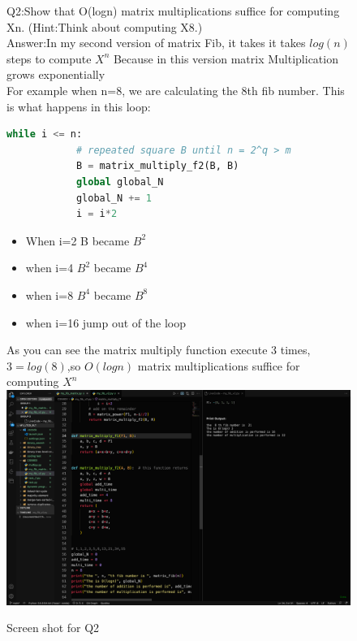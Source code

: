 \documentclass{article}
\begin{document}
\begin{enumerate}[label=(\alph*)]
    \begin{figure}[h]
    \item Q2:Show that O(logn) matrix multiplications suffice for computing Xn. (Hint:Think about computing X8.)\\
    Answer:In my second version of matrix Fib, it takes it takes $log(n)$ steps to compute $X^n$
    Because in this version matrix Multiplication grows exponentially\\
    \noindent For example when n=8, we are calculating the 8th fib number. This is what happens in this loop:
    \begin{lstlisting}[language=Python, caption=loop code]
        while i <= n:
            # repeated square B until n = 2^q > m
            B = matrix_multiply_f2(B, B)
            global global_N
            global_N += 1
            i = i*2
        \end{lstlisting}
    \begin{itemize}
        \item When i=2 B became $B^2$
        \item when i=4 $B^2$ became $B^4$
        \item when i=8 $B^4$ became $B^8$
        \item when i=16 jump out of the loop
    \end{itemize}
As you can see the matrix multiply function execute 3 times, $3=log(8)$,so $O(logn)$ matrix multiplications suffice for computing $X^n$\\

    \includegraphics[width=1.5\textwidth, inner]{ss fdr q2}
    \caption{Screen shot for Q2}
    \label{fig:figure2}
    \end{figure}
\end{enumerate}
\end{document}
